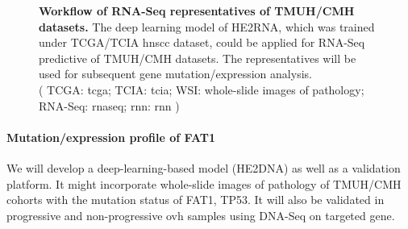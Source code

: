 \documentclass[12pt, a4paper]{article}
\newcommand{\bcaption}[2]{\caption{\textbf{#1} #2}}
\begin{document}
\begin{figure}[hp]
\bcaption{Workflow of RNA-Seq representatives of TMUH/CMH datasets.}
{The deep learning model of HE2RNA, which was trained under TCGA/TCIA \acrshort{hnscc} dataset, could be applied for RNA-Seq predictive of TMUH/CMH datasets. The representatives will be used for subsequent gene mutation/expression analysis.\\
(
TCGA: \acrlong{tcga};
TCIA: \acrlong{tcia};
WSI: whole-slide images of pathology; 
RNA-Seq: \acrlong{rnaseq}; 
\acrshort{rnn}: \acrlong{rnn}
)
} %
\label{fig:HE2RNA}
\end{figure}

\clearpage



\paragraph{Mutation/expression profile of FAT1} %




We will develop a deep-learning-based model (HE2DNA) as well as a validation platform. 
It might incorporate whole-slide images of pathology of TMUH/CMH cohorts with the mutation status of FAT1, TP53.
It will also be validated in progressive and non-progressive \acrshort{ovh} samples using DNA-Seq on targeted gene.
\end{document}
